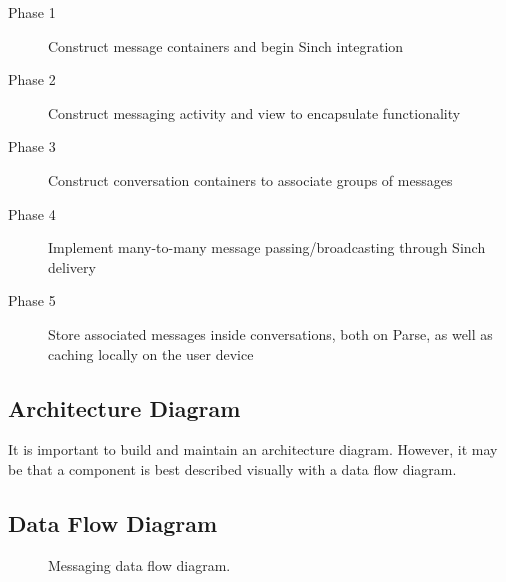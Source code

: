 \begin{description}
  \item [Phase 1] Construct message containers and begin Sinch integration
  \item [Phase 2] Construct messaging activity and view to encapsulate functionality
  \item [Phase 3] Construct conversation containers to associate groups of messages
  \item [Phase 4] Implement many-to-many message passing/broadcasting through Sinch delivery
  \item [Phase 5] Store associated messages inside conversations, both on Parse, as well as caching locally on the user device
\end{description}

\subsection{Architecture Diagram}
It is important to build and maintain an architecture diagram.  However, it may 
be that a component is best described visually with a data flow diagram. 

\subsection{Data Flow Diagram}

	\begin{figure}[tbh!]
	\begin{center}
	\end{center}
	\caption{Messaging data flow diagram. \label{MessagingDataFlow}}
	\end{figure}

